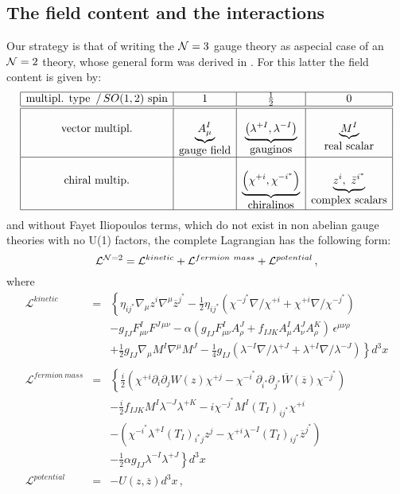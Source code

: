 \documentclass[a4paper,12pt]{article}
\newcommand{\ft}[2]{{\textstyle\frac{#1}{#2}}}
\def\l{\lambda}
\begin{document}
\subsection{The field content and the interactions}
Our strategy is that of writing the ${\cal N}=3$ gauge theory
as aspecial case of an ${\cal N}=2$ theory, whose general form
was derived in \cite{susp}. For this latter the field content
is given by:
\begin{equation}
   \begin{array}{|c|c|c|c|}
   \hline
     \mbox{multipl. type $\, /\,SO(1,2)$ spin}  &  1 & \ft 1 2 & 0 \\
     \hline
     \hline
     \null & \null &\null & \null \\
     \mbox{vector multipl.} &  \underbrace{A^I_\mu}_{\mbox{gauge field}} &
     \underbrace{\left( \lambda^{+I},\lambda^{-I}
     \right)}_{\mbox{gauginos}}  &\underbrace{ M^I}_{\mbox{real scalar}} \\
     \hline
     \null &  \null &\null & \null \\
     \mbox{chiral multip.} &  \null &\underbrace{\left( \chi^{+i},\chi^{-i^*}
     \right)}_{\mbox{chiralinos}}  & \underbrace{ z^i,\ \bar z^{i^*}}_
     {\mbox{complex scalars}}
     \\
     \hline
   \end{array}
\label{fieldcont}
\end{equation}
and without Fayet Iliopoulos terms, which do not exist in
non abelian gauge theories with no U(1) factors,
the complete Lagrangian has the following form:
\begin{equation}\label{N=2stLag}
{\cal L}^{{\cal N}=2}={\cal L}^{kinetic}
+{\cal L}^{fermion~mass}+{\cal L}^{potential}\,,
\end{equation}
where
\begin{eqnarray}\label{N=2chiralst}
\mathcal{L}^{kinetic}&=&\left\{
\eta_{ij^*}\nabla_\mu z^i\nabla^\mu\overline z^{j^*}
-\ft{1}{2}\eta_{ij^*}\left(\chi^{-j^*}{\nabla\!\!\!\!/}\chi^{+i}
+\chi^{+i}{\nabla\!\!\!\!/}\chi^{-j^*}\right)
\right.\nonumber\\
&&-g_{IJ}F^I_{\mu\nu}F^{J\,\mu\nu} - \alpha \left( g_{IJ}
F^I_{\mu\nu}A^J_\rho + f_{IJK} A^I_\mu A^J_\nu A^K_\rho \right)  \,
\epsilon^{\mu\nu\rho}\nonumber\\
&&+\left.\ft{1}{2}g_{IJ}\nabla_\mu M^I\nabla^\mu M^J
-\ft{1}{4}g_{IJ}\left(\l^{-I}{\nabla\!\!\!\!/}\l^{+J}
+\l^{+I}{\nabla\!\!\!\!/}\l^{-J}\right)\right\}d^3x\\
&&\nonumber\\
\mathcal{L}^{fermion~mass}&=&
\left\{\ft{i}{2}\left(\chi^{+i}\partial_i\partial_jW(z)\chi^{+j}
-\chi^{-i^*}\partial_{i^*}\partial_{j^*}\overline W(\overline z)
\chi^{-j^*}\right)\right.\nonumber\\
&&-\ft{i}{2}f_{IJK}M^I\l^{-J}\l^{+K}
-i\chi^{-j^*}M^I(T_I)_{ij^*}\chi^{+i}\nonumber\\
&&-\left(\chi^{-i^*}\l^{+I}(T_I)_{i^*j}z^j
-\chi^{+i}\l^{-I}(T_I)_{ij^*}\overline z^{j^*}\right)\nonumber\\
&&\left.-\ft{1}{2}\alpha g_{IJ}\l^{-I}\l^{+J}\right\}d^3x\\
\mathcal{L}^{potential}&=&-U(z,\overline z)d^3x\,,
\end{eqnarray}
\end{document}
